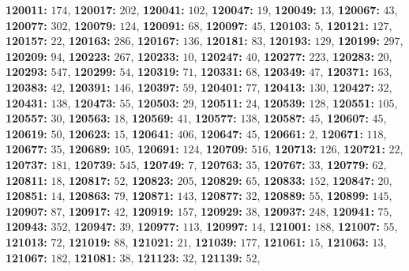 \textsf{\bfseries 120011:} $174$, \textsf{\bfseries 120017:} $202$, \textsf{\bfseries 120041:} $102$, \textsf{\bfseries 120047:} $19$, \textsf{\bfseries 120049:} $13$, \textsf{\bfseries 120067:} $43$, \textsf{\bfseries 120077:} $302$, \textsf{\bfseries 120079:} $124$, \textsf{\bfseries 120091:} $68$, \textsf{\bfseries 120097:} $45$, \textsf{\bfseries 120103:} $5$, \textsf{\bfseries 120121:} $127$, \textsf{\bfseries 120157:} $22$, \textsf{\bfseries 120163:} $286$, \textsf{\bfseries 120167:} $136$, \textsf{\bfseries 120181:} $83$, \textsf{\bfseries 120193:} $129$, \textsf{\bfseries 120199:} $297$, \textsf{\bfseries 120209:} $94$, \textsf{\bfseries 120223:} $267$, \textsf{\bfseries 120233:} $10$, \textsf{\bfseries 120247:} $40$, \textsf{\bfseries 120277:} $223$, \textsf{\bfseries 120283:} $20$, \textsf{\bfseries 120293:} $547$, \textsf{\bfseries 120299:} $54$, \textsf{\bfseries 120319:} $71$, \textsf{\bfseries 120331:} $68$, \textsf{\bfseries 120349:} $47$, \textsf{\bfseries 120371:} $163$, \textsf{\bfseries 120383:} $42$, \textsf{\bfseries 120391:} $146$, \textsf{\bfseries 120397:} $59$, \textsf{\bfseries 120401:} $77$, \textsf{\bfseries 120413:} $130$, \textsf{\bfseries 120427:} $32$, \textsf{\bfseries 120431:} $138$, \textsf{\bfseries 120473:} $55$, \textsf{\bfseries 120503:} $29$, \textsf{\bfseries 120511:} $24$, \textsf{\bfseries 120539:} $128$, \textsf{\bfseries 120551:} $105$, \textsf{\bfseries 120557:} $30$, \textsf{\bfseries 120563:} $18$, \textsf{\bfseries 120569:} $41$, \textsf{\bfseries 120577:} $138$, \textsf{\bfseries 120587:} $45$, \textsf{\bfseries 120607:} $45$, \textsf{\bfseries 120619:} $50$, \textsf{\bfseries 120623:} $15$, \textsf{\bfseries 120641:} $406$, \textsf{\bfseries 120647:} $45$, \textsf{\bfseries 120661:} $2$, \textsf{\bfseries 120671:} $118$, \textsf{\bfseries 120677:} $35$, \textsf{\bfseries 120689:} $105$, \textsf{\bfseries 120691:} $124$, \textsf{\bfseries 120709:} $516$, \textsf{\bfseries 120713:} $126$, \textsf{\bfseries 120721:} $22$, \textsf{\bfseries 120737:} $181$, \textsf{\bfseries 120739:} $545$, \textsf{\bfseries 120749:} $7$, \textsf{\bfseries 120763:} $35$, \textsf{\bfseries 120767:} $33$, \textsf{\bfseries 120779:} $62$, \textsf{\bfseries 120811:} $18$, \textsf{\bfseries 120817:} $52$, \textsf{\bfseries 120823:} $205$, \textsf{\bfseries 120829:} $65$, \textsf{\bfseries 120833:} $152$, \textsf{\bfseries 120847:} $20$, \textsf{\bfseries 120851:} $14$, \textsf{\bfseries 120863:} $79$, \textsf{\bfseries 120871:} $143$, \textsf{\bfseries 120877:} $32$, \textsf{\bfseries 120889:} $55$, \textsf{\bfseries 120899:} $145$, \textsf{\bfseries 120907:} $87$, \textsf{\bfseries 120917:} $42$, \textsf{\bfseries 120919:} $157$, \textsf{\bfseries 120929:} $38$, \textsf{\bfseries 120937:} $248$, \textsf{\bfseries 120941:} $75$, \textsf{\bfseries 120943:} $352$, \textsf{\bfseries 120947:} $39$, \textsf{\bfseries 120977:} $113$, \textsf{\bfseries 120997:} $14$, \textsf{\bfseries 121001:} $188$, \textsf{\bfseries 121007:} $55$, \textsf{\bfseries 121013:} $72$, \textsf{\bfseries 121019:} $88$, \textsf{\bfseries 121021:} $21$, \textsf{\bfseries 121039:} $177$, \textsf{\bfseries 121061:} $15$, \textsf{\bfseries 121063:} $13$, \textsf{\bfseries 121067:} $182$, \textsf{\bfseries 121081:} $38$, \textsf{\bfseries 121123:} $32$, \textsf{\bfseries 121139:} $52$, 
